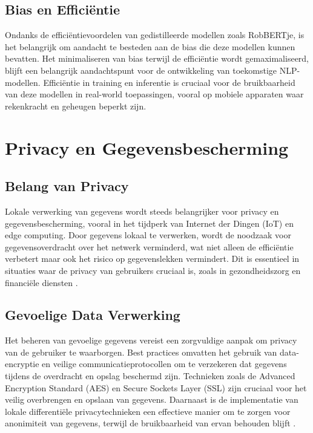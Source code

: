 \subsection{Bias en Efficiëntie}

Ondanks de efficiëntievoordelen van gedistilleerde modellen zoals RobBERTje, is het belangrijk om aandacht te besteden aan de bias die deze modellen kunnen bevatten. Het minimaliseren van bias terwijl de efficiëntie wordt gemaximaliseerd, blijft een belangrijk aandachtspunt voor de ontwikkeling van toekomstige NLP-modellen. Efficiëntie in training en inferentie is cruciaal voor de bruikbaarheid van deze modellen in real-world toepassingen, vooral op mobiele apparaten waar rekenkracht en geheugen beperkt zijn.


\section{Privacy en Gegevensbescherming}

\subsection{Belang van Privacy}

Lokale verwerking van gegevens wordt steeds belangrijker voor privacy en gegevensbescherming, vooral in het tijdperk van Internet der Dingen (IoT) en edge computing. Door gegevens lokaal te verwerken, wordt de noodzaak voor gegevensoverdracht over het netwerk verminderd, wat niet alleen de efficiëntie verbetert maar ook het risico op gegevenslekken vermindert. Dit is essentieel in situaties waar de privacy van gebruikers cruciaal is, zoals in gezondheidszorg en financiële diensten \autocite{Bi2020}.

\subsection{Gevoelige Data Verwerking}

Het beheren van gevoelige gegevens vereist een zorgvuldige aanpak om privacy van de gebruiker te waarborgen. Best practices omvatten het gebruik van data-encryptie en veilige communicatieprotocollen om te verzekeren dat gegevens tijdens de overdracht en opslag beschermd zijn. Technieken zoals de Advanced Encryption Standard (AES) en Secure Sockets Layer (SSL) zijn cruciaal voor het veilig overbrengen en opslaan van gegevens. Daarnaast is de implementatie van lokale differentiële privacytechnieken een effectieve manier om te zorgen voor anonimiteit van gegevens, terwijl de bruikbaarheid van ervan behouden blijft \autocite{Shah2014}.

